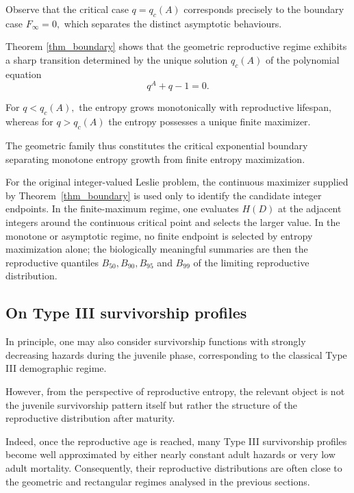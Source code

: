 \documentclass[10pt,a4paper]{amsart}
\theoremstyle{definition}
\theoremstyle{remark}
\numberwithin{equation}{section}
\begin{document}
Observe that the critical case
$
q=q_c(A)
$
corresponds precisely to the boundary case
$
F_\infty=0,
$
which separates the distinct asymptotic behaviours.

Theorem \ref{thm_boundary} shows that the geometric reproductive regime exhibits a sharp transition determined by the unique solution
$
q_c(A)
$
of the polynomial equation
\[
q^A+q-1=0.
\]

For
$
q<q_c(A),
$
the entropy grows monotonically with reproductive lifespan, whereas for
$
q>q_c(A)
$
the entropy possesses a unique finite maximizer.

The geometric family thus constitutes the critical exponential boundary separating monotone entropy growth from finite entropy maximization.

For the original integer-valued Leslie problem, the continuous maximizer supplied by Theorem~\ref{thm_boundary} is used only to identify the candidate integer endpoints. In the finite-maximum regime, one evaluates $H(D)$ at the adjacent integers around the continuous critical point and selects the larger value. In the monotone or asymptotic regime, no finite endpoint is selected by entropy maximization alone; the biologically meaningful summaries are then the reproductive quantiles $B_{50},B_{90},B_{95}$ and $B_{99}$ of the limiting reproductive distribution.




\subsection{On Type III survivorship profiles}

In principle, one may also consider survivorship functions with
strongly decreasing hazards during the juvenile phase, corresponding
to the classical Type III demographic regime.

However, from the perspective of reproductive entropy, the relevant
object is not the juvenile survivorship pattern itself but rather the
structure of the reproductive distribution after maturity.

Indeed, once the reproductive age is reached, many Type III
survivorship profiles become well approximated by either nearly
constant adult hazards or very low adult mortality. Consequently,
their reproductive distributions are often close to the geometric and
rectangular regimes analysed in the previous sections.
\end{document}
